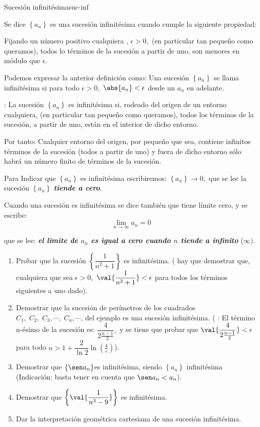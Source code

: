 \begin{defi}{Sucesión infinitésima}{suc-inf}\label{def:suc-inf}

Se dice $\left\{ a_{n}\right\} $ es una sucesión infinitésima cuando
cumple la siguiente propiedad:

Fijando un número positivo cualquiera , $\epsilon>0,$ (en particular
tan pequeño como queramos), todos lo términos de la sucesión a partir
de uno, son menores en módulo que $\epsilon.$ 

\end{defi}

Podemos expresar la anterior definición como: Una sucesión $\left\{ a_{n}\right\} $
se llama infinitésima si para todo $\epsilon>0,$ $\abs{a_{n}}<\epsilon$
desde un $a_{n}$ en adelante.

: La sucesión $\left\{ a_{n}\right\} $
es infinitésima si, rodeado del origen de un entorno cualquiera, (en
particular tan pequeño como queramos), todos los términos de la sucesión,
a partir de uno, están en el interior de dicho entorno.

Por tanto: Cualquier entorno del origen, por pequeño que sea, contiene
infinitos términos de la sucesión (todos a partir de uno) y fuera
de dicho entorno sólo habrá un número finito de términos de la sucesión. 

\notacion Para Indicar que $\left\{ a_{n}\right\} $ es infinitésima
escribiremos: $\left\{ a_{n}\right\} \rightarrow0,$ que se lee la
sucesión $\left\{ a_{n}\right\} $ \textbf{\textsl{tiende a cero}}.

Cuando una sucesión es infinitésima se dice también que tiene límite
cero, y se escribe:
\[
\lim_{n\rightarrow\infty}a_{n}=0
\]

que se lee: \textbf{\textsl{el límite de $a_{n}$ es igual a cero
cuando $n$ tiende a infinito}} ($\infty).$

\begin{ejercicios}[]
\begin{enumerate}
\item Probar que la sucesión $\left\{ \dfrac{1}{n^{2}+1}\right\} $ es infinitésima.
( hay que demostrar que, cualquiera que sea $\epsilon>0,$ $\val{\dfrac{1}{n^{2}+1}}<\epsilon$
para todos los términos siguientes a uno dado).
\item Demostrar que la sucesión de perímetros de los cuadrados $C_{1},\;C_{2},\;C_{3},\cdots,\;C_{n},\cdots$,
del ejemplo  es una sucesión infinitésima. ( :
El término n-ésimo de la sucesión es: $\dfrac{4}{2\frac{n-1}{2}},$
y se tiene que probar que $\val{\dfrac{4}{2\frac{n-1}{2}}}<\epsilon$
para todo $n>1+\dfrac{2}{\ln2}\ln\left(\frac{4}{\epsilon}\right)$).
\item Demostrar que $\left\{ \sen a_{n}\right\} $es infinitésima, siendo
$\left\{ a_{n}\right\} $ infinitésima (Indicación: basta tener en
cuenta que $\sen a_{n}<a_{n}$).
\item Demostrar que $\left\{ \val{\dfrac{1}{n^{3}-9}}\right\} $ es infinitésima.
\item Dar la interpretación geométrica cartesiana de una sucesión infinitésima.
\end{enumerate}
\end{ejercicios}

